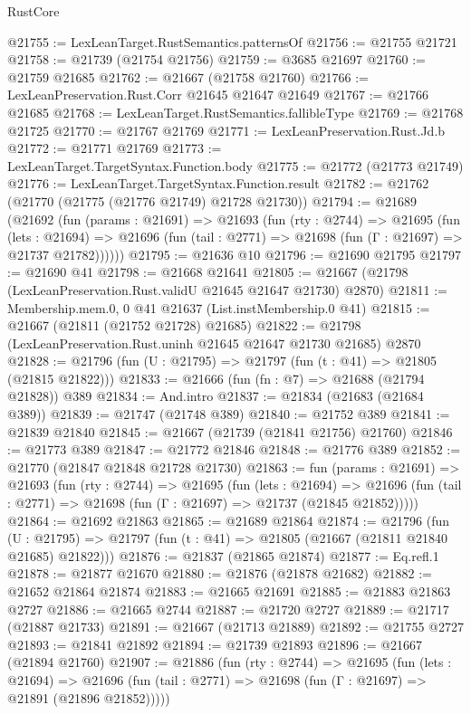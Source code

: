 \begin{lexlean}{RustCore}
\begin{coremodule}
@21755 := LexLeanTarget.RustSemantics.patternsOf
@21756 := @21755 @21721
@21758 := @21739 (@21754 @21756)
@21759 := @3685 @21697
@21760 := @21759 @21685
@21762 := @21667 (@21758 @21760)
@21766 := LexLeanPreservation.Rust.Corr @21645 @21647 @21649
@21767 := @21766 @21685
@21768 := LexLeanTarget.RustSemantics.fallibleType
@21769 := @21768 @21725
@21770 := @21767 @21769
@21771 := LexLeanPreservation.Rust.Jd.b
@21772 := @21771 @21769
@21773 := LexLeanTarget.TargetSyntax.Function.body
@21775 := @21772 (@21773 @21749)
@21776 := LexLeanTarget.TargetSyntax.Function.result
@21782 := @21762 (@21770 (@21775 (@21776 @21749) @21728 @21730))
@21794 := @21689
    (@21692
      (fun (params : @21691) =>
      @21693
        (fun (rty : @2744) =>
        @21695
          (fun (lets : @21694) =>
          @21696 (fun (tail : @2771) => @21698 (fun (Γ : @21697) => @21737 @21782))))))
@21795 := @21636 @10
@21796 := @21690 @21795
@21797 := @21690 @41
@21798 := @21668 @21641
@21805 := @21667 (@21798 (LexLeanPreservation.Rust.validU @21645 @21647 @21730) @2870)
@21811 := Membership.mem.{0, 0} @41 @21637 (List.instMembership.{0} @41)
@21815 := @21667 (@21811 (@21752 @21728) @21685)
@21822 := @21798 (LexLeanPreservation.Rust.uninh @21645 @21647 @21730 @21685) @2870
@21828 := @21796 (fun (U : @21795) => @21797 (fun (t : @41) => @21805 (@21815 @21822)))
@21833 := @21666 (fun (fn : @7) => @21688 (@21794 @21828)) @389
@21834 := And.intro
@21837 := @21834 (@21683 (@21684 @389))
@21839 := @21747 (@21748 @389)
@21840 := @21752 @389
@21841 := @21839 @21840
@21845 := @21667 (@21739 (@21841 @21756) @21760)
@21846 := @21773 @389
@21847 := @21772 @21846
@21848 := @21776 @389
@21852 := @21770 (@21847 @21848 @21728 @21730)
@21863 := fun (params : @21691) =>
  @21693
    (fun (rty : @2744) =>
    @21695
      (fun (lets : @21694) =>
      @21696 (fun (tail : @2771) => @21698 (fun (Γ : @21697) => @21737 (@21845 @21852)))))
@21864 := @21692 @21863
@21865 := @21689 @21864
@21874 := @21796
    (fun (U : @21795) => @21797 (fun (t : @41) => @21805 (@21667 (@21811 @21840 @21685) @21822)))
@21876 := @21837 (@21865 @21874)
@21877 := Eq.refl.{1}
@21878 := @21877 @21670
@21880 := @21876 (@21878 @21682)
@21882 := @21652 @21864 @21874
@21883 := @21665 @21691
@21885 := @21883 @21863 @2727
@21886 := @21665 @2744
@21887 := @21720 @2727
@21889 := @21717 (@21887 @21733)
@21891 := @21667 (@21713 @21889)
@21892 := @21755 @2727
@21893 := @21841 @21892
@21894 := @21739 @21893
@21896 := @21667 (@21894 @21760)
@21907 := @21886
    (fun (rty : @2744) =>
    @21695
      (fun (lets : @21694) =>
      @21696 (fun (tail : @2771) => @21698 (fun (Γ : @21697) => @21891 (@21896 @21852)))))

\end{coremodule}
\end{lexlean}
